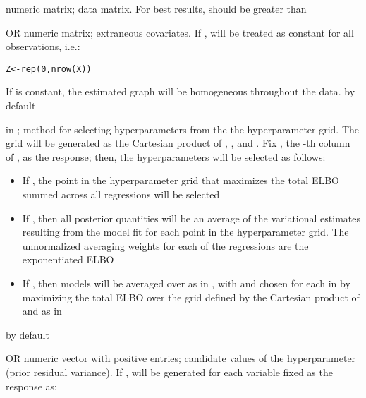 \documentclass[a4paper]{book}
\begin{document}
\begin{Arguments}
\begin{ldescription}
\item[\code{X}]  numeric matrix; data matrix. For best
results,  should be greater than 

\item[\code{Z}]  OR  numeric matrix; extraneous
covariates. If ,  will be treated as constant for all observations,
i.e.:

\begin{alltt}Z <- rep(0, nrow(X))
\end{alltt}


If  is constant, the estimated graph will be homogeneous throughout the
data.  by default

\item[\code{hp\_method}]  in ;
method for selecting hyperparameters from the the hyperparameter grid. The
grid will be generated as the Cartesian product of , , and .
Fix , the -th column of , as the response; then, the
hyperparameters will be selected as follows:

\begin{itemize}

\item{} If , the point in the hyperparameter grid that
maximizes the total ELBO summed across all  regressions will be
selected
\item{} If , then all posterior quantities will be an
average of the variational estimates resulting from the model fit for each
point in the hyperparameter grid. The unnormalized averaging weights for
each of the  regressions are the exponentiated ELBO
\item{} If , then models will be averaged over  as in
, with  and
 chosen for each \eqn{\pi}{} in 
by maximizing the total ELBO over the grid defined by the Cartesian
product of  and  as in 

\end{itemize}


 by default

\item[\code{ssq}]  OR numeric vector with positive entries; candidate values
of the hyperparameter  (prior residual variance). If
,  will be generated for each variable  fixed as the
response as:


\end{ldescription}
\end{Arguments}
\end{document}
